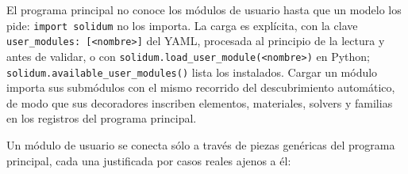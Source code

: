 \documentclass[11pt,oneside]{report}
\begin{document}
El programa principal no conoce los módulos de usuario hasta que un modelo los pide: \texttt{import solidum} no los importa. La carga es explícita, con la clave \texttt{user\_\allowbreak{}modules: [\textless{}nombre\textgreater{}]} del YAML, procesada al principio de la lectura y antes de validar, o con \texttt{solidum.\allowbreak{}load\_\allowbreak{}user\_\allowbreak{}module(\textquotedbl{}\textless{}nombre\textgreater{}\textquotedbl{})} en Python; \texttt{solidum.\allowbreak{}available\_\allowbreak{}user\_\allowbreak{}modules()} lista los instalados. Cargar un módulo importa sus submódulos con el mismo recorrido del descubrimiento automático, de modo que sus decoradores inscriben elementos, materiales, solvers y familias en los registros del programa principal.

Un módulo de usuario se conecta sólo a través de piezas genéricas del programa principal, cada una justificada por casos reales ajenos a él:
\end{document}
